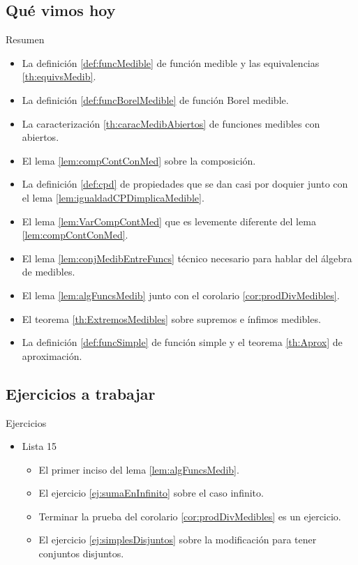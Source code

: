 \documentclass[utf8]{beamer}
\theoremstyle{plain}
\theoremstyle{definition}
\theoremstyle{remark}
\numberwithin{equation}{section}
\renewcommand{\.}{\Cdot}                %
\begin{document}
\subsection*{Qu\'e vimos hoy}

\begin{frame}{Resumen}

  \begin{itemize}
  \item La definición \ref{def:funcMedible} de función medible y las equivalencias \ref{th:equivsMedib}.
  \item La definición \ref{def:funcBorelMedible} de función Borel medible.
  \item La caracterización \ref{th:caracMedibAbiertos} de funciones medibles con abiertos.
  \item El lema \ref{lem:compContConMed} sobre la composición.
  \item La definición \ref{def:cpd} de propiedades que se dan casi por doquier junto con el lema \ref{lem:igualdadCPDimplicaMedible}.
  \item El lema \ref{lem:VarCompContMed} que es levemente diferente del lema \ref{lem:compContConMed}.
  \item El lema \ref{lem:conjMedibEntreFuncs} técnico necesario para hablar del álgebra de medibles. 
  \item El lema \ref{lem:algFuncsMedib} junto con el corolario \ref{cor:prodDivMedibles}.
  \item El teorema \ref{th:ExtremosMedibles} sobre supremos e ínfimos medibles.
  \item La definición \ref{def:funcSimple} de función simple y el teorema \ref{th:Aprox} de aproximación.
  \end{itemize}
  
\end{frame}

\subsection*{Ejercicios a trabajar}
\begin{frame}{Ejercicios}
    
  \begin{itemize}
    \item
      Lista 15
      \begin{itemize}
      \item El primer inciso del lema \ref{lem:algFuncsMedib}.
      \item El ejercicio \ref{ej:sumaEnInfinito} sobre el caso infinito.
      \item Terminar la prueba del corolario \ref{cor:prodDivMedibles} es un ejercicio.
      \item El ejercicio \ref{ej:simplesDisjuntos} sobre la modificación para tener conjuntos disjuntos.
      \end{itemize}
    \end{itemize}
  
\end{frame}
\end{document}
